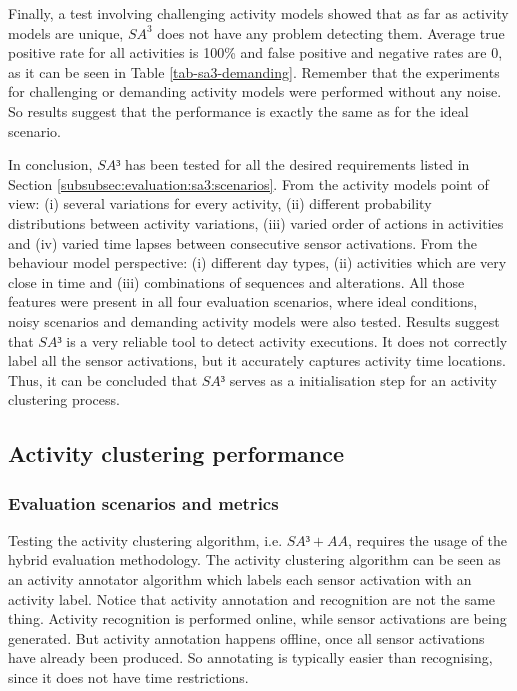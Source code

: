 Finally, a test involving challenging activity models showed that as far as activity models are unique, $SA^3$ does not have any problem detecting them. Average true positive rate for all activities is 100\% and false positive and negative rates are 0, as it can be seen in Table \ref{tab-sa3-demanding}. Remember that the experiments for challenging or demanding activity models were performed without any noise. So results suggest that the performance is exactly the same as for the ideal scenario. 

In conclusion, $SA³$ has been tested for all the desired requirements listed in Section \ref{subsubsec:evaluation:sa3:scenarios}. From the activity models point of view: (i) several variations for every activity, (ii) different probability distributions between activity variations, (iii) varied order of actions in activities and (iv) varied time lapses between consecutive sensor activations. From the behaviour model perspective: (i) different day types, (ii) activities which are very close in time and (iii) combinations of sequences and alterations. All those features were present in all four evaluation scenarios, where ideal conditions, noisy scenarios and demanding activity models were also tested. Results suggest that $SA³$ is a very reliable tool to detect activity executions. It does not correctly label all the sensor activations, but it accurately captures activity time locations. Thus, it can be concluded that $SA³$ serves as a initialisation step for an activity clustering process.

\subsection{Activity clustering performance}
\label{subsec:evaluation:clustering}

\subsubsection{Evaluation scenarios and metrics}
\label{subsubsec:evaluation:clustering:scenarios}
Testing the activity clustering algorithm, i.e. $SA³ + AA$, requires the usage of the hybrid evaluation methodology. The activity clustering algorithm can be seen as an activity annotator algorithm which labels each sensor activation with an activity label. Notice that activity annotation and recognition are not the same thing. Activity recognition is performed online, while sensor activations are being generated. But activity annotation happens offline, once all sensor activations have already been produced. So annotating is typically easier than recognising, since it does not have time restrictions. 

